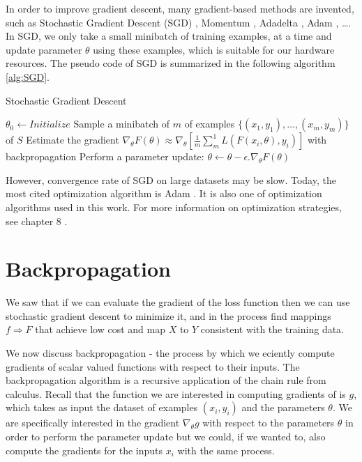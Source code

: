 In order to improve gradient descent, many gradient-based methods are invented, such as Stochastic Gradient Descent (SGD) \cite{SGD}, Momentum \cite{Momentum}, Adadelta \cite{DBLP:adadelta}, Adam \cite{article:Adam-optimization}, \dots. In SGD, we only take a small minibatch of training examples, at a time and update parameter $\displaystyle \theta$ using these examples, which is suitable for our hardware resources. The pseudo code of SGD is summarized in the following algorithm \ref{alg:SGD}.
\begin{algorithm}
    \caption{Stochastic Gradient Descent} \label{alg:SGD}
    \begin{algorithmic}[1]
        \State $\theta_0 \gets \textit{Initialize}$
        \Repeat
            \State Sample a minibatch of $\displaystyle m$ of examples $\displaystyle \{(x_1, y_1), \dots, (x_m, y_m)\}$ of $\displaystyle S$
            \State Estimate the gradient $\displaystyle \nabla_{\theta}F(\theta) \approx \nabla_{\theta}[\frac{1}{m}\sum_{m}^{1}{L(F(x_i, \theta),y_i)}]$ with backpropagation
            \State Perform a parameter update: $\displaystyle \theta \gets \theta - \epsilon . \nabla_{\theta}F(\theta)$
    \end{algorithmic}
\end{algorithm}

However, convergence rate of SGD on large datasets may be slow. Today, the most cited optimization algorithm is Adam \cite{article:Adam-optimization}. It is also one of optimization algorithms used in this work. For more information on optimization strategies, see chapter 8 \cite{dlbook}.

\section{Backpropagation}
We saw that if we can evaluate the gradient of the loss function then we can use stochastic gradient descent to minimize it, and in the process find mappings $\displaystyle f \Rightarrow F$ that achieve low cost and map $\displaystyle X$ to $\displaystyle Y$ consistent with the training data.

We now discuss backpropagation - the process by which we eciently compute gradients of scalar valued functions with respect to their inputs. The backpropagation algorithm is a recursive application of the chain rule from calculus. Recall that the function we are interested in computing gradients of is $\displaystyle g$, which takes as input the dataset of examples $\displaystyle (x_i, y_i)$ and the parameters $\displaystyle \theta$. We are specifically interested in the gradient $\displaystyle \nabla_\theta g$ with respect to the parameters $\theta$ in order to perform the parameter update but we could, if we wanted to, also compute the gradients for the inputs $\displaystyle x_i$ with the same process.

